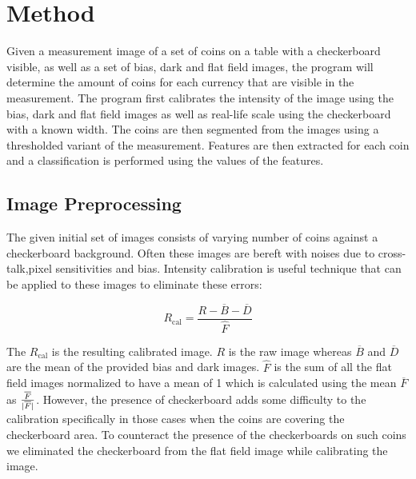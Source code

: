 \documentclass[report.tex]{subfile}
\begin{document}

\section{Method}
Given a measurement image of a set of coins on a table with a checkerboard
visible, as well as a set of bias, dark and flat field images, the program will
determine the amount of coins for each currency that are visible in the
measurement. The program first calibrates the intensity of the image using the
bias, dark and flat field images as well as real-life scale using the
checkerboard with a known width. The coins are then segmented from the images
using a thresholded variant of the measurement. Features are then extracted for
each coin and a classification is performed using the values of the features.

\subsection{Image Preprocessing}
The given initial set of images consists of varying number of coins against a
checkerboard background. Often these images are bereft with noises due to
cross-talk,pixel sensitivities and bias. Intensity calibration is useful
technique that can be applied to these images to eliminate these errors:

\begin{equation*}
    R_{\textrm{cal}} = \frac{R - \overline{B} - \overline{D}}{\hat{F}}
\end{equation*}

The $R_{\textrm{cal}}$ is the resulting calibrated image. $R$ is the raw image
whereas $\overline{B}$ and $\overline{D}$ are the mean of the provided bias and
dark images. $\hat{F}$ is the sum of all the flat field images normalized to
have a mean of 1 which is calculated using the mean $\overline{F}$ as
$\frac{\overline{F}}{\lvert\overline{F}\rvert}$. However, the presence of
checkerboard adds some difficulty to the calibration specifically in those
cases when the coins are covering the checkerboard area. To counteract the
presence of the checkerboards on such coins we eliminated the checkerboard from
the flat field image while calibrating the image.
\end{document}
